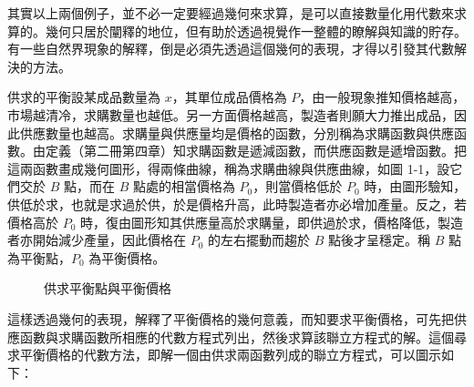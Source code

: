 其實以上兩個例子，並不必一定要經過幾何來求算，是可以直接數量化用代數來求算的。幾何只居於闡釋的地位，但有助於透過視覺作一整體的瞭解與知識的貯存。有一些自然界現象的解釋，倒是必須先透過這個幾何的表現，才得以引發其代數解決的方法。

\begin{example}
供求的平衡\quad 設某成品數量為 $x$，其單位成品價格為 $P$，由一般現象推知價格越高，市場越清冷，求購數量也越低。另一方面價格越高，製造者則願大力推出成品，因此供應數量也越高。求購量與供應量均是價格的函數，分別稱為求購函數與供應函數。由定義（第二冊第四章）知求購函數是遞減函數，而供應函數是遞增函數。把這兩函數畫成幾何圖形，得兩條曲線，稱為求購曲線與供應曲線，如圖 1-1，設它們交於 $B$ 點，而在 $B$ 點處的相當價格為 $P_0$，則當價格低於 $P_0$ 時，由圖形驗知，供低於求，也就是求過於供，於是價格升高，此時製造者亦必增加產量。反之，若價格高於 $P_0$ 時，復由圖形知其供應量高於求購量，即供過於求，價格降低，製造者亦開始減少產量，因此價格在 $P_0$ 的左右擺動而趨於 $B$ 點後才呈穩定。稱 $B$ 點為平衡點，$P_0$ 為平衡價格。
\end{example}

\begin{figure}[H]
\centering
{}
\caption{供求平衡點與平衡價格}
\label{fig:b3-fig1-1}
\end{figure}

這樣透過幾何的表現，解釋了平衡價格的幾何意義，而知要求平衡價格，可先把供應函數與求購函數所相應的代數方程式列出，然後求算該聯立方程式的解。這個尋求平衡價格的代數方法，即解一個由供求兩函數列成的聯立方程式，可以圖示如下：

